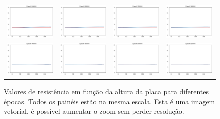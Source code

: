 \documentclass{aleph-revista}
\begin{document}
\begin{figure}[!ht]
\begin{tabular}{cccc}
    \includegraphics[width=0.22\linewidth]{res_24000} &
    \includegraphics[width=0.22\linewidth]{res_28000} &
    \includegraphics[width=0.22\linewidth]{res_32000} &
    \includegraphics[width=0.22\linewidth]{res_36000}   \\

    \includegraphics[width=0.22\linewidth]{res_40000} &
    \includegraphics[width=0.22\linewidth]{res_45000} &
    \includegraphics[width=0.22\linewidth]{res_50000} &
    \includegraphics[width=0.22\linewidth]{res_55000}   \\
  \end{tabular}
  \caption{Valores de resistência em função da altura da placa para diferentes épocas. Todos os painéis estão na mesma escala. Esta é uma imagem vetorial, é possível aumentar o zoom sem perder resolução.}
  \label{fig:resist_table}
\end{figure}
\end{document}
